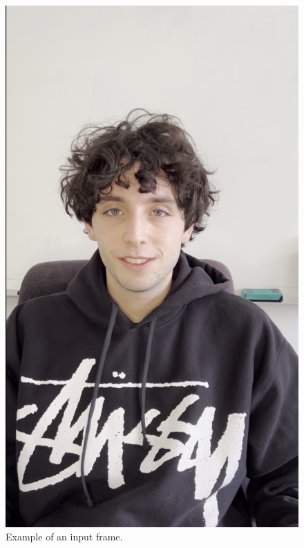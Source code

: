\documentclass[preprint]{elsarticle}
\begin{document}
\begin{figure}[H]
	\centering
	\includegraphics[scale=0.2, keepaspectratio]{img/project_img/init.png}
	\caption{Example of an input frame.}\label{fig:init-frame}
\end{figure}
\end{document}
